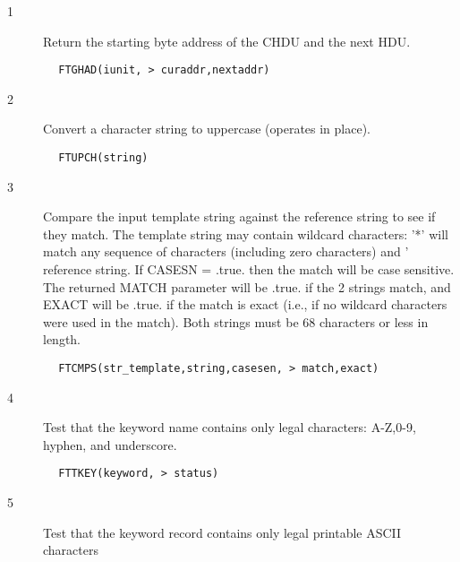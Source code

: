 \documentclass[11pt]{book}
\begin{document}
\begin{description}
\item[1 ] Return the starting byte address of the CHDU and the next HDU.
\end{description}

\begin{verbatim}
        FTGHAD(iunit, > curaddr,nextaddr)
\end{verbatim}

\begin{description}
\item[2 ] Convert a character string to uppercase (operates in place).
\end{description}

\begin{verbatim}
        FTUPCH(string)
\end{verbatim}

\begin{description}
\item[3 ] Compare the input template string against the reference string
    to see if they match.  The template string may contain wildcard
    characters: '*' will match any sequence of characters (including
    zero characters) and '%
    reference string.  If CASESN = .true. then the match will be
    case sensitive.  The returned MATCH parameter will be .true. if
    the 2 strings match, and EXACT will be .true. if the match is
    exact (i.e., if no wildcard characters were used in the match).
   Both strings must be 68 characters or less in length.
\end{description}

\begin{verbatim}
        FTCMPS(str_template,string,casesen, > match,exact)
\end{verbatim}


\begin{description}
\item[4 ] Test that the keyword name contains only legal characters: A-Z,0-9,
   hyphen, and underscore.
\end{description}

\begin{verbatim}
        FTTKEY(keyword, > status)
\end{verbatim}

\begin{description}
\item[5 ] Test that the keyword record contains only legal printable ASCII
     characters
\end{description}
\end{document}
